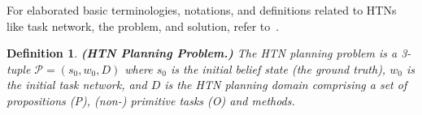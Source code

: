 \documentclass[letterpaper]{article} %
\newtheorem{definition}{Definition}
\begin{document}



For elaborated basic terminologies, notations, and definitions related to HTNs like task network, the problem, and solution, refer to~\cite{naubooks0014222}.  


\begin{definition}
\textbf{(HTN Planning Problem.)} 
The HTN planning
problem is a 3-tuple $\mathcal{P} = (s_0, w_0, D)$ where $s_0$ is the initial belief state (the ground truth), $w_0$ is the initial task network, and $D$ is the HTN planning domain comprising a set of propositions (P), (non-) primitive tasks (O) and methods.
\end{definition}
\end{document}
